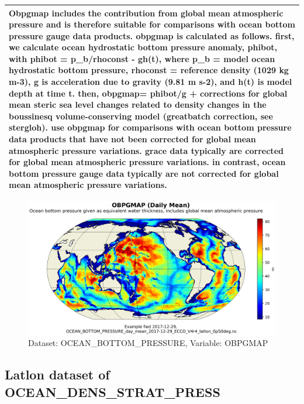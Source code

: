 \begin{longtable}{|m{}|m{}|m{}|m{}|}
\multicolumn{4}{|p{1\textwidth}|}{Obpgmap includes the contribution from global mean atmospheric pressure and is therefore suitable for comparisons with ocean bottom pressure gauge data products. obpgmap is calculated as follows. first, we calculate ocean hydrostatic bottom pressure anomaly, phibot, with phibot = p\_b/rhoconst - gh(t), where p\_b = model ocean hydrostatic bottom pressure, rhoconst = reference density (1029 kg m-3), g is acceleration due to gravity (9.81 m s-2), and h(t) is model depth at time t. then, obpgmap= phibot/g + corrections for global mean steric sea level changes related to density changes in the boussinesq volume-conserving model (greatbatch correction, see stergloh). use obpgmap for comparisons with ocean bottom pressure data products that have not been corrected for global mean atmospheric pressure variations. grace data typically are corrected for global mean atmospheric pressure variations. in contrast, ocean bottom pressure gauge data typically are not corrected for global mean atmospheric pressure variations.} \\ \hline
\end{longtable}

\begin{figure}[H]
\centering
\includegraphics[scale=0.55]{../images/plots/latlon_plots/Ocean_Bottom_Pressure/OBPGMAP.png}
\caption{Dataset: OCEAN\_BOTTOM\_PRESSURE, Variable: OBPGMAP}
\label{tab:table-OCEAN_BOTTOM_PRESSURE_OBPGMAP-Plot}
\end{figure}
\subsection{Latlon dataset of OCEAN\_DENS\_STRAT\_PRESS}
\newp
